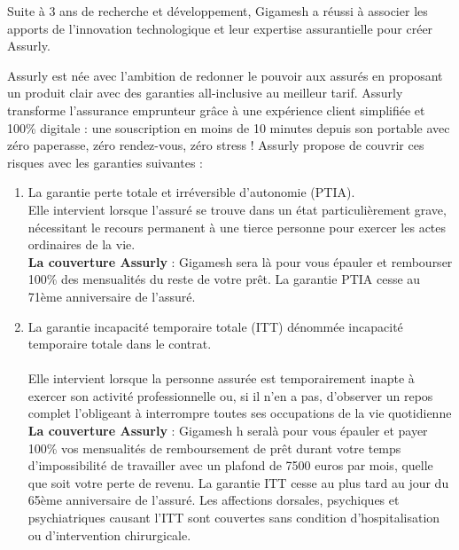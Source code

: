 Suite à 3 ans de recherche et développement, Gigamesh a réussi à associer les apports de l’innovation
technologique et leur expertise assurantielle pour créer Assurly.

Assurly est née avec l’ambition de redonner le pouvoir aux assurés en proposant un produit clair avec des
garanties all-inclusive au meilleur tarif. Assurly transforme l’assurance emprunteur grâce à une expérience client simplifiée et 100\% digitale : une souscription en moins de 10 minutes depuis son portable avec zéro paperasse, zéro rendez-vous, zéro stress !
Assurly propose de couvrir ces risques avec les garanties suivantes :

\begin{enumerate}
	\item La garantie perte totale et irréversible d’autonomie (PTIA).\\
	
Elle intervient lorsque l’assuré se trouve dans un état particulièrement grave, nécessitant le recours permanent à une tierce personne pour exercer les actes ordinaires de la vie.\\

\textbf{La couverture Assurly} : Gigamesh sera là pour vous épauler et rembourser 100\% des mensualités du reste de votre prêt. La garantie PTIA cesse au 71ème anniversaire de l’assuré.

\item La garantie incapacité temporaire totale (ITT) dénommée incapacité temporaire totale dans le contrat.\\\\

Elle intervient lorsque la personne assurée est temporairement inapte à exercer son activité professionnelle ou, si il n’en a pas, d’observer un repos complet l’obligeant à interrompre toutes ses occupations de la vie
quotidienne\\

\textbf{La couverture Assurly} : Gigamesh 
h seralà pour vous épauler et payer 100\% vos mensualités de remboursement de prêt durant votre temps d’impossibilité de travailler avec un plafond de 7500 euros par mois, quelle que soit votre perte de revenu. La garantie ITT cesse au plus tard au jour du 65ème anniversaire de l’assuré. Les affections dorsales, psychiques et psychiatriques causant l’ITT sont couvertes sans condition d’hospitalisation
ou d’intervention chirurgicale.
\end{enumerate}
